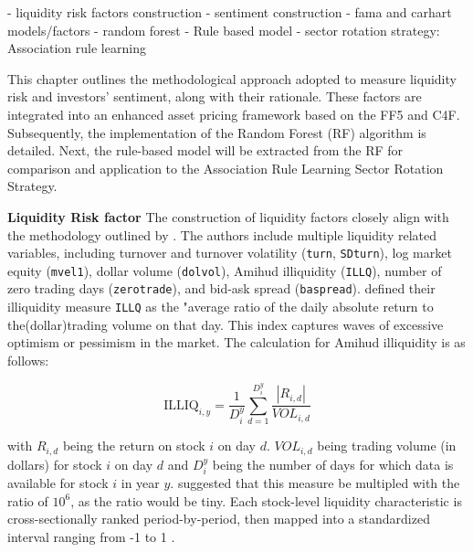
- liquidity risk factors construction
- sentiment construction
- fama and carhart models/factors 
- random forest
- Rule based model
- sector rotation strategy: Association rule learning

This chapter outlines the methodological approach adopted to measure liquidity risk and investors' sentiment, along with their rationale. These factors are integrated into an enhanced asset pricing framework based on the FF5 and C4F. Subsequently, the implementation of the Random Forest (RF) algorithm is detailed. Next, the rule-based model will be extracted from the RF for comparison and application to the Association Rule Learning Sector Rotation Strategy.

\textbf{Liquidity Risk factor}
The construction of liquidity factors closely align with the methodology outlined by . The authors include multiple liquidity related variables, including turnover and turnover volatility (\texttt{turn}, \texttt{SDturn}), log market equity (\texttt{mvel1}), dollar volume (\texttt{dolvol}), Amihud illiquidity (\texttt{ILLQ}), number of zero trading days (\texttt{zerotrade}), and bid-ask spread (\texttt{baspread}).  defined their illiquidity measure \texttt{ILLQ} as the "average ratio of the daily absolute return to the(dollar)trading volume on that day. This index captures waves of excessive optimism or pessimism in the market.  The calculation for Amihud illiquidity is as follows:

\begin{equation}
    \label{eq:amihud}
    \text{ILLIQ}_{i,y} = \frac{1}{D_i^y} \sum_{d=1}^{D_i^y} \frac{|R_{i,d}|}{VOL_{i,d}}
\end{equation}
    
with $R_{i,d}$ being the return on stock $i$ on day $d$. $VOL_{i,d}$ being trading volume (in dollars) for stock $i$ on day $d$ and $D_i^{y}$ being the number of days for which data is available for stock $i$ in year $y$.  suggested that this measure be multipled with the ratio of $10^6$, as the ratio would be tiny. Each stock-level liquidity characteristic is cross-sectionally ranked period-by-period, then mapped into a standardized interval ranging from -1 to 1 \cite{gu_2020}. 



